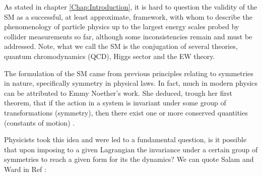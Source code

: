 \documentclass[10pt]{book}
\renewcommand{\(}{\left(}
\renewcommand{\)}{\right)}
\renewcommand{\[}{\left[}
\renewcommand{\]}{\right]}
\begin{document}
%
%


As stated in chapter \ref{Chap:Introduction}, it is hard to question the validity of the SM as a successful, at least approximate, framework, with whom to describe the phenomenology of particle physics up to the largest energy scales probed by collider measurements so far, although some inconsistencies remain and must be addressed.  
%
Note, what we call the SM is the conjugation of several theories, quantum chromodynamics (QCD), Higgs sector and the EW theory. 
%
%

The formulation of the SM came from previous principles relating to symmetries in nature, specifically symmetry in physical laws. 
%
In fact, much in modern physics can be attributed to Emmy Noether's work. She deduced, trough her first theorem, that if the action in a system is invariant under some group of transformations (symmetry), then there exist one or more conserved quantities (constants of motion) \cite{doi:10.1080/00411457108231446}. 

Physicists took this idea and were led to a fundamental question, is it possible that upon imposing to a given Lagrangian the invariance under a certain group of symmetries to reach a given form for its the dynamics? 
%
%
We can quote Salam and Ward in Ref \cite{Salam1961}: %
\end{document}
